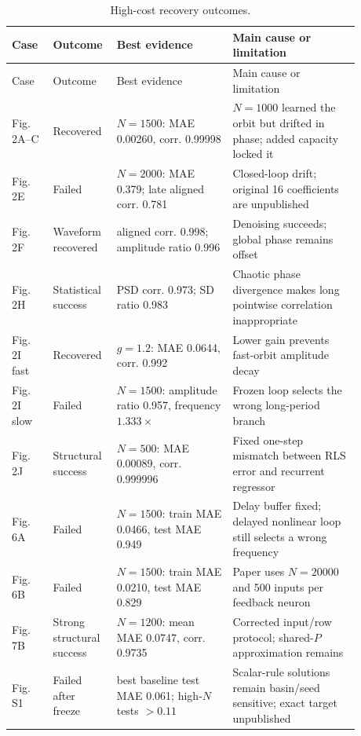 {\small
\setlength{\tabcolsep}{4pt}
\begin{longtable}{@{}p{0.11\linewidth}p{0.12\linewidth}p{0.31\linewidth}p{0.34\linewidth}@{}}
\caption{High-cost recovery outcomes.\label{tab:recovery}}\\
\toprule
Case & Outcome & Best evidence & Main cause or limitation \\
\midrule
\endfirsthead
\toprule
Case & Outcome & Best evidence & Main cause or limitation \\
\midrule
\endhead
Fig. 2A--C & Recovered & $N=1500$: MAE 0.00260, corr. 0.99998 & $N=1000$ learned the orbit but drifted in phase; added capacity locked it \\
Fig. 2E & Failed & $N=2000$: MAE 0.379; late aligned corr. 0.781 & Closed-loop drift; original 16 coefficients are unpublished \\
Fig. 2F & Waveform recovered & aligned corr. 0.998; amplitude ratio 0.996 & Denoising succeeds; global phase remains offset \\
Fig. 2H & Statistical success & PSD corr. 0.973; SD ratio 0.983 & Chaotic phase divergence makes long pointwise correlation inappropriate \\
Fig. 2I fast & Recovered & $g=1.2$: MAE 0.0644, corr. 0.992 & Lower gain prevents fast-orbit amplitude decay \\
Fig. 2I slow & Failed & $N=1500$: amplitude ratio 0.957, frequency $1.333\times$ & Frozen loop selects the wrong long-period branch \\
Fig. 2J & Structural success & $N=500$: MAE 0.00089, corr. 0.999996 & Fixed one-step mismatch between RLS error and recurrent regressor \\
Fig. 6A & Failed & $N=1500$: train MAE 0.0466, test MAE 0.949 & Delay buffer fixed; delayed nonlinear loop still selects a wrong frequency \\
Fig. 6B & Failed & $N=1500$: train MAE 0.0210, test MAE 0.829 & Paper uses $N=20000$ and 500 inputs per feedback neuron \\
Fig. 7B & Strong structural success & $N=1200$: mean MAE 0.0747, corr. 0.9735 & Corrected input/row protocol; shared-$P$ approximation remains \\
Fig. S1 & Failed after freeze & best baseline test MAE 0.061; high-$N$ tests $>0.11$ & Scalar-rule solutions remain basin/seed sensitive; exact target unpublished \\
\bottomrule
\end{longtable}
}

